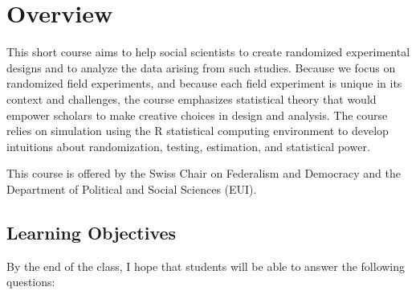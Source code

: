 \documentclass[letterpaper]{inzane_syllabus} %
\begin{document}

\makeprofile%

\section{Overview}



This short course aims to help social scientists to create randomized
experimental designs and to analyze the data arising from such studies.
Because we focus on randomized field experiments, and because each field
experiment is unique in its context and challenges, the course emphasizes
statistical theory that would empower scholars to make creative choices in
design and analysis. The course relies on simulation using the R statistical
computing environment to develop intuitions about randomization, testing,
estimation, and statistical power.

This course is offered by the Swiss Chair on Federalism and Democracy and the
Department of Political and Social Sciences (EUI).


\subsection{Learning Objectives}

By the end of the class, I hope that students will be able to answer the following questions:
\end{document}
